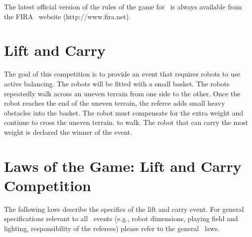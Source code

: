 \documentclass[12pt]{hurocup}
\begin{document}
The latest official version of the rules of the game for \HuroCup\ is
always available from the FIRA \HuroCup\ website (http://www.fira.net).

\newpage

\section{Lift and Carry}
\label{sec:lift-and-carry} 

The goal of this competition is to provide an event that requires
robots to use active balancing. The robots will be fitted with a small
basket. The robots repeatedly walk across an uneven terrain from one
side to the other. Once the robot reaches the end of the uneven
terrain, the referee adds small heavy obstacles into the basket. The
robot must compensate for the extra weight and continue to cross the
uneven terrain.  to walk. The robot that can carry the most weight is
declared the winner of the event.

\section{Laws of the Game: Lift and Carry Competition}
\label{sec:rules-lift-carry}

The following laws describe the specifics of the lift and carry
event. For general specifications relevant to all \HuroCup\ events
(e.g., robot dimensions, playing field and lighting, responsibility of
the referees) please refer to the general \HuroCup\ laws.

\label{lc-field}
\end{document}
